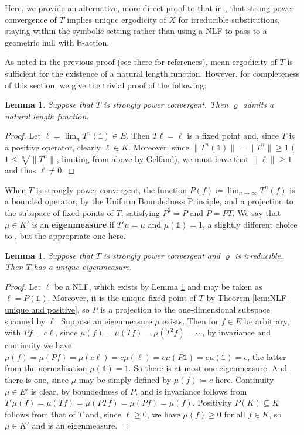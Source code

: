 \documentclass[11pt]{amsart}
\numberwithin{equation}{section}
\theoremstyle{plain}
\newtheorem{lemma}[theorem]{Lemma}
\theoremstyle{definition}
\newcommand{\R}{{\mathbb R}}
\newcommand{\sub}{\varrho}
\newcommand{\bbo}{\mathds{1}} %
\begin{document}
Here, we provide an alternative, more direct proof to that in \cite{MRW25}, that strong power convergence of \(T\) implies unique ergodicity of \(X\) for irreducible substitutions, staying within the symbolic setting rather than using a NLF to pass to a geometric hull with \(\R\)-action.

As noted in the previous proof (see there for references), mean ergodicity of \(T\) is sufficient for the existence of a natural length function. However, for completeness of this section, we give the trivial proof of the following:

\begin{lemma}\label{lem:SPC=>NLF}
Suppose that \(T\) is strongly power convergent. Then \(\sub\) admits a natural length function.
\end{lemma}

\begin{proof}
Let \(\ell = \lim_n T^n(\bbo) \in E\). Then \(T\ell = \ell\) is a fixed point and, since \(T\) is a positive operator, clearly \(\ell \in K\). Moreover, since \(\|T^n(\bbo)\| = \|T^n\| \geq 1\) (\(1 \leq \sqrt[n]{\|T^n\|}\), limiting from above by Gelfand), we must have that \(\|\ell\| \geq 1\) and thus \(\ell \neq 0\).
\end{proof}

When \(T\) is strongly power convergent, the function \(P(f) \coloneqq \lim_{n \to \infty} T^n(f)\) is a bounded operator, by the Uniform Boundedness Principle, and a projection to the subspace of fixed points of \(T\), satisfying \(P^2 = P\) and \(P = PT\). We say that \(\mu \in K'\) is an \textbf{eigenmeasure} if \(T' \mu = \mu\) and \(\mu(\bbo) = 1\), a slightly different choice to \cite[Definition 4.24]{MRW25}, but the appropriate one here.

\begin{lemma}
Suppose that \(T\) is strongly power convergent and \(\sub\) is irreducible. Then \(T\) has a unique eigenmeasure.
\end{lemma}

\begin{proof}
Let \(\ell\) be a NLF, which exists by Lemma \ref{lem:SPC=>NLF} and may be taken as \(\ell = P(\bbo)\). Moreover, it is the unique fixed point of \(T\) by Theorem \ref{lem:NLF unique and positive}, so \(P\) is a projection to the one-dimensional subspace spanned by \(\ell\). Suppose an eigenmeasure \(\mu\) exists. Then for \(f \in E\) be arbitrary, with \(Pf = c\ell\), since \(\mu(f) = \mu(Tf) = \mu(T^2f) = \cdots\), by invariance and continuity we have \(\mu(f) = \mu(Pf) = \mu(c \ell) = c \mu(\ell) = c \mu(P \bbo) = c \mu(\bbo) = c\), the latter from the normalisation \(\mu(\bbo) = 1\). So there is at most one eigenmeasure. And there is one, since \(\mu\) may be simply defined by \(\mu(f) \coloneqq c\) here. Continuity \(\mu \in E'\) is clear, by boundedness of \(P\), and is invariance follows from \(T'\mu(f) = \mu(Tf) = \mu(PTf) = \mu(Pf) = \mu(f)\). Positivity \(P(K) \subseteq K\) follows from that of \(T\) and, since \(\ell \geq 0\), we have \(\mu(f) \geq 0\) for all \(f \in K\), so \(\mu \in K'\) and is an eigenmeasure.
\end{proof}
\end{document}
